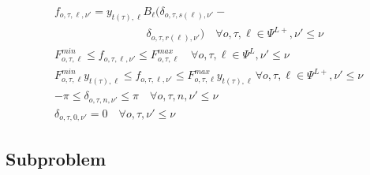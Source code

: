 \documentclass[final]{IEEEtran}
\begin{document}
\begin{align}
&f_{o, \tau, \ell, \nu'} = y_{t(\tau), \ell} B_\ell (\delta_{o, \tau, s(\ell), \nu'} - \nonumber \\
&\quad \quad \quad \quad \quad \quad \quad \quad \, \, \delta_{o, \tau, r(\ell), \nu'}) \quad \forall o, \tau, \ell \in \Psi^{L+}, \nu' \leq \nu \\
&F_{o, \tau, \ell}^{min} \leq f_{o, \tau, \ell, \nu'} \leq F_{o, \tau, \ell}^{max} \quad \forall o, \tau, \ell \in \Psi^L, \nu' \leq \nu \\
&\label{master_last} F_{o, \tau, \ell}^{min} y_{t(\tau), \ell} \leq f_{o, \tau, \ell, \nu'} \leq F_{o, \tau, \ell}^{max} y_{t(\tau), \ell} \, \forall o, \tau, \ell \in \Psi^{L+}, \nu' \leq \nu \\
&-\pi \leq \delta_{o, \tau, n, \nu'} \leq \pi \quad \forall o, \tau, n, \nu' \leq \nu \\
&\delta_{o, \tau, 0, \nu'} = 0 \quad \forall o, \tau, \nu' \leq \nu
\end{align}

\subsection{Subproblem}
\end{document}
